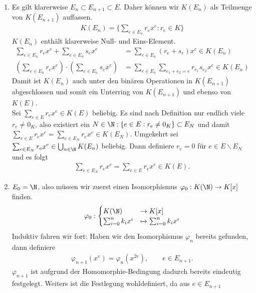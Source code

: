 \begin{solution}
\leavevmode \\
\begin{enumerate}
  \item Es gilt klarerweise $E_n \subset E_{n+1} \subset E$. Daher können wir $K(E_n)$
  als Teilmenge von $K(E_{n+1})$ auffassen.
  \begin{align*}
    K(E_n) = \{\sum_{e \in E_n}r_ex^e: r_e \in K\}
  \end{align*}
  $K(E_n)$ enthält klarerweise Null- und Eins-Element.
  \begin{align*}
    \sum_{e \in E_n}r_ex^e + \sum_{e \in E_n}s_ex^e &= \sum_{e \in E_n}(r_e + s_e)x^e \in K(E_n) \\
    \left(\sum_{e \in E_n}r_ex^e\right)\cdot\left(\sum_{e \in E_n}s_ex^e\right) &=
    \sum_{e \in E_n}\sum_{e_1 + e_2 = e}r_{e_1}s_{e_2}x^e \in K(E_n)
  \end{align*}
  Damit ist $K(E_n)$ auch unter den binären Operationen in $K(E_{n+1})$
  abgeschlossen und somit ein Unterring von $K(E_{n+1})$ und ebenso von $K(E)$. \\
  Sei $\sum_{e \in E}r_ex^e \in K(E)$ beliebig. Es sind nach Definition nur endlich
  viele $r_e \neq 0_K$, also existiert ein $N \in \N: \{e \in E: r_e \neq 0_K\} \subset E_N$
  und damit $\sum_{e \in E}r_ex^e = \sum_{e \in E_N}r_ex^e \in K(E_N)$.
  Umgekehrt sei $\sum_{e \in E_N}r_ex^e \in \bigcup_{n \in \N}K(E_n)$ beliebig.
  Dann definiere $r_e = 0$ für $e \in E\backslash E_N$ und es folgt
  \begin{align*}
    \sum_{e \in E_N}r_ex^e = \sum_{e \in E}r_ex^e \in K(E).
  \end{align*}
  \item $E_0 = \N$, also müssen wir zuerst einen Isomorphismus $\varphi_0: K(\N) \to K[x]$
  finden.
  \begin{align*}
    \varphi_0: \begin{cases}
      K(\N) &\to K[x] \\
      \sum_{i = 0}^nk_ix^i &\mapsto \sum_{i = 0}^nk_ix^i
    \end{cases}
  \end{align*}
  Induktiv fahren wir fort: Haben wir den Isomorphismus $\varphi_n$ bereits gefunden,
  dann definiere
  \begin{align*}
    \varphi_{n+1}(x^e) = \varphi_n(x^{2e}), \qquad e \in E_{n+1}.
  \end{align*}
  $\varphi_{n+1}$ ist aufgrund der Homomorphie-Bedingung dadurch bereits eindeutig
  festgelegt. Weiters ist die Festlegung wohldefiniert, da aus $e \in E_{n+1}$

\end{enumerate}
\end{solution}
